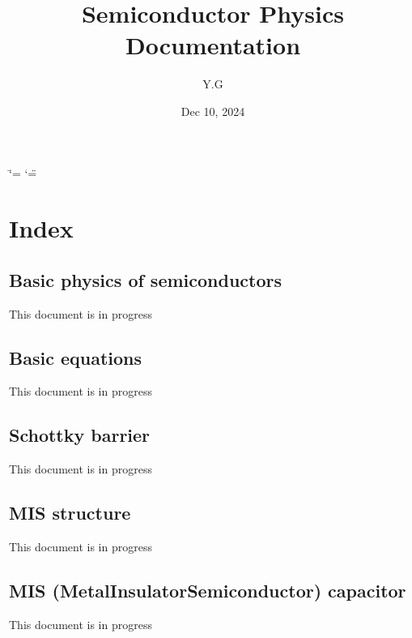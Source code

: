 \documentclass[a4paper,10pt,english]{sphinxmanual}
\title{Semiconductor Physics Documentation}
\date{Dec 10, 2024}
\author{Y.G}
\begin{document}
\ifdefined\shorthandoff
  \ifnum\catcode`\=\string=\active\shorthandoff{=}\fi
  \ifnum\catcode`\"=\active{}\fi
\fi

\pagestyle{empty}
\sphinxmaketitle
\pagestyle{plain}
\sphinxtableofcontents
\pagestyle{normal}
\label{\detokenize{index::doc}}



\chapter{Index}
\label{\detokenize{index:index}}
\sphinxstepscope


\section{Basic physics of semiconductors}
\label{\detokenize{Basic_physics_of_semiconductors:basic-physics-of-semiconductors}}\label{\detokenize{Basic_physics_of_semiconductors::doc}}
\sphinxAtStartPar
This document is in progress

\sphinxstepscope


\section{Basic equations}
\label{\detokenize{Basic_equation:basic-equations}}\label{\detokenize{Basic_equation::doc}}
\sphinxAtStartPar
This document is in progress

\sphinxstepscope


\section{Schottky barrier}
\label{\detokenize{Schottky_barrier:schottky-barrier}}\label{\detokenize{Schottky_barrier::doc}}
\sphinxAtStartPar
This document is in progress

\sphinxstepscope


\section{MIS structure}
\label{\detokenize{MIS_structure:mis-structure}}\label{\detokenize{MIS_structure::doc}}
\sphinxAtStartPar
This document is in progress

\sphinxstepscope


\section{MIS (Metal\sphinxhyphen{}Insulator\sphinxhyphen{}Semiconductor) capacitor}
\label{\detokenize{MIS_capacitor:mis-metal-insulator-semiconductor-capacitor}}\label{\detokenize{MIS_capacitor::doc}}
\sphinxAtStartPar
This document is in progress
\end{document}
